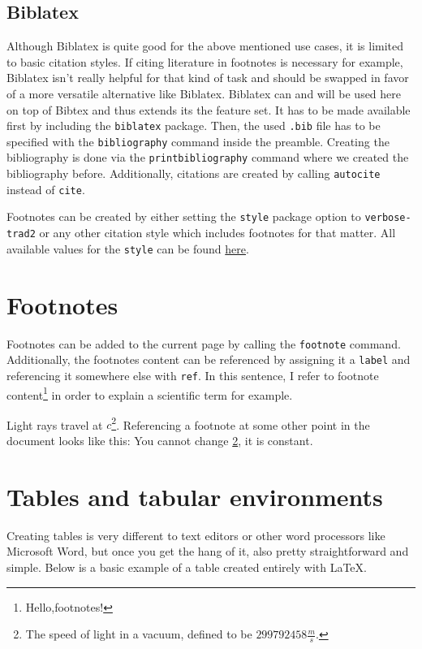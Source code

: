 \documentclass{article}
\begin{document}
\subsection{Biblatex}

Although Biblatex is quite good for the above mentioned use cases, it is limited
to basic citation styles. If citing literature in footnotes is necessary for
example, Biblatex isn't really helpful for that kind of task and should be
swapped in favor of a more versatile alternative like Biblatex. Biblatex can
and will be used here on top of Bibtex and thus extends its the feature set. It
has to be made available first by including the \texttt{biblatex} package. Then,
the used \texttt{.bib} file has to be specified with the \texttt{bibliography}
command inside the preamble. Creating the bibliography is done via the
\texttt{printbibliography} command where we created the bibliography before.
Additionally, citations are created by calling \texttt{autocite} instead of
\texttt{cite}.

Footnotes can be created by either setting the \texttt{style} package option to
\texttt{verbose-trad2} or any other citation style which includes footnotes for
that matter. All available values for the \texttt{style} can be found
\href{https://ctan.joethei.xyz/macros/latex/contrib/biblatex/doc/biblatex.pdf#subsection.3.3}{here}.

\section{Footnotes}

Footnotes can be added to the current page by calling the \texttt{footnote}
command. Additionally, the footnotes content can be referenced by assigning it a
\texttt{label} and referencing it somewhere else with \texttt{ref}. In this
sentence, I refer to footnote content\footnote{Hello,footnotes!} in order to
explain a scientific term for example.

Light rays travel at $c$\footnote{\label{speed_of_light}The speed of light in a
vacuum, defined to be $299792458\frac{m}{s}$.}. Referencing a footnote at some
other point in the document looks like this: You cannot change
\ref{speed_of_light}, it is constant.

\newpage
\section{Tables and tabular environments}

Creating tables is very different to text editors or other word processors like
Microsoft Word, but once you get the hang of it, also pretty straightforward and
simple. Below is a basic example of a table created entirely with \LaTeX. 
\end{document}
